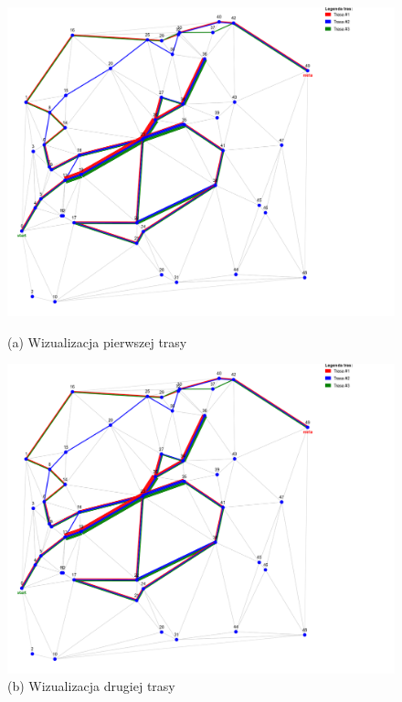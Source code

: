\documentclass{article}
\begin{document}
\begin{figure}[H]
    \centering
    \begin{minipage}[b]{0.48\linewidth}
        \includegraphics[width=\linewidth]{423C496B-894F-48DF-AD3A-845B3B00989B.png}
        \caption*{(a) Wizualizacja pierwszej trasy}
    \end{minipage}
    \hfill
    \begin{minipage}[b]{0.48\linewidth}
        \includegraphics[width=\linewidth]{423C496B-894F-48DF-AD3A-845B3B00989B.png}
        \caption*{(b) Wizualizacja drugiej trasy}
    \end{minipage}


\end{figure}
\end{document}

